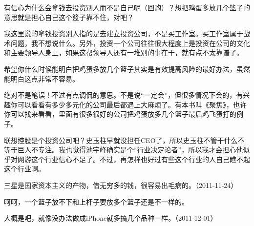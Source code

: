
有信心为什么会拿钱去投资别人而不是自己呢（回购）？想把鸡蛋多放几个篮子的意思就是担心自己这个篮子靠不住，对吧？

我这里说的拿钱投资别人指的是去建立投资公司，不是买工作室。买工作室属于战术问题，我不想说什么。另外，投资一个公司往往很大程度上是投资在公司的文化和主要领导人身上，如果这帮领导人还有一堆别的事在干，就有点不太靠谱了。


希望你什么时候能明白把鸡蛋多放几个篮子其实是有效提高风险的最好办法，虽然能明白这点非常不容易。


绝对不是笔误！不过有点调侃的意思。不是说“一定会”，但很多情况下会的，有兴趣你可以看看有多少多元化的公司最后都遇上大麻烦了。有本书叫《聚焦》，也许你可以找来看看，里面有很多很好的公司把鸡蛋放多几个篮子最后鸡飞蛋打的例子。


联想控股是个投资公司吧？史玉柱早就没担任CEO了，所以史玉柱不管干什么不等于巨人不专注。我也觉得池宇峰确实是个“行业决定论者”，所以我才会担心他似乎对网游这个行业信心不足了。不过，再怎样也好过有些这个行业的人自己瞧不起这个行业啊。


三星是国家资本主义的产物，借无穷多的钱，很容易出毛病的。（2011-11-24）


呵呵，一个篮子放不下和上杆子要放多个篮子还是不一样的。


大概是吧，就像没办法做成iPhone就多搞几个品种一样。（2011-12-01）


